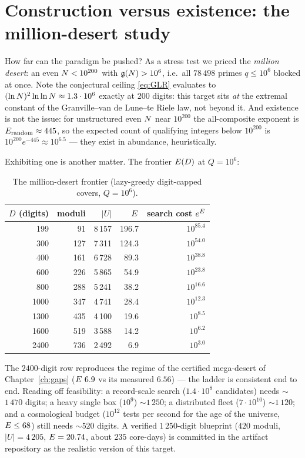 \section{Construction versus existence: the million-desert study}\label{sec:million}

How far can the paradigm be pushed? As a stress test we priced the
\emph{million desert}: an even $N<10^{200}$ with $\mathfrak{g}(N)>10^6$, i.e.\
all $78\,498$ primes $q\le10^6$ blocked at once. Note the conjectural
ceiling \eqref{eq:GLR} evaluates to
$(\ln N)^2\ln\ln N\approx1.3\cdot10^6$ exactly at $200$ digits: this
target sits \emph{at} the extremal constant of the
Granville--van de Lune--te Riele law, not beyond it. And existence is
not the issue: for unstructured even $N$ near $10^{200}$ the
all-composite exponent is $E_{\mathrm{random}}\approx445$, so the
expected count of qualifying integers below $10^{200}$ is
$10^{200}e^{-445}\approx10^{6.5}$ --- they exist in abundance,
heuristically.

Exhibiting one is another matter. The frontier $E(D)$ at $Q=10^6$:

\begin{table}[h]
\centering\small
\caption{The million-desert frontier (lazy-greedy digit-capped covers,
$Q=10^6$).}\label{tab:million}
\begin{tabular}{rrrrr}
\toprule
$D$ (digits) & moduli & $|U|$ & $E$ & search cost $e^{E}$\\
\midrule
199 & 91 & 8\,157 & 196.7 & $10^{85.4}$\\
300 & 127 & 7\,311 & 124.3 & $10^{54.0}$\\
400 & 161 & 6\,728 & 89.3 & $10^{38.8}$\\
600 & 226 & 5\,865 & 54.9 & $10^{23.8}$\\
800 & 288 & 5\,241 & 38.2 & $10^{16.6}$\\
1000 & 347 & 4\,741 & 28.4 & $10^{12.3}$\\
1300 & 435 & 4\,100 & 19.6 & $10^{8.5}$\\
1600 & 519 & 3\,588 & 14.2 & $10^{6.2}$\\
2400 & 736 & 2\,492 & 6.9 & $10^{3.0}$\\
\bottomrule
\end{tabular}
\end{table}

The $2400$-digit row reproduces the regime of the certified mega-desert
of Chapter~\ref{ch:gaps} ($\Ee\ 6.9$ vs its measured $6.56$) --- the
ladder is consistent end to end. Reading off feasibility: a
record-scale search ($1.4\cdot10^8$ candidates) needs
$\sim$$1\,470$ digits; a heavy single box ($10^9$) $\sim$$1\,250$; a
distributed fleet ($7\cdot10^{10}$) $\sim$$1\,120$; and a cosmological
budget ($10^{12}$ tests per second for the age of the universe,
$E\le68$) still needs $\sim$$520$ digits. A verified $1\,250$-digit
blueprint ($420$ moduli, $|U|=4\,205$, $E=20.74$, about $235$
core-days) is committed in the artifact repository as the realistic
version of this target.

